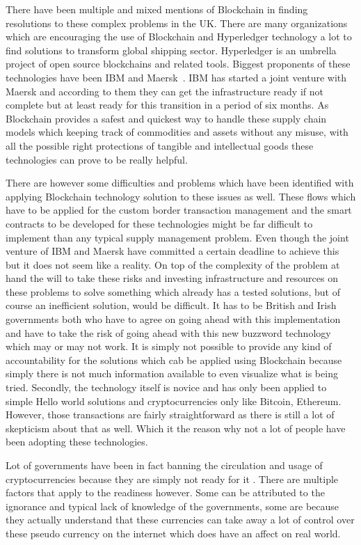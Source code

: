 There have been multiple and mixed mentions of Blockchain in finding
resolutions to these complex problems in the UK. There are many
organizations which are encouraging the use of Blockchain and
Hyperledger technology a lot to find solutions to transform global
shipping sector. Hyperledger is an umbrella project of open source
blockchains and related tools. Biggest proponents of these
technologies have been IBM and Maersk~\cite{stratfor1}. IBM has
started a joint venture with Maersk and according to them they can get
the infrastructure ready if not complete but at least ready for this
transition in a period of six months. As Blockchain provides a safest
and quickest way to handle these supply chain models which keeping
track of commodities and assets without any misuse, with all the
possible right protections of tangible and intellectual goods these
technologies can prove to be really helpful.

There are however some difficulties and problems which have been
identified with applying Blockchain technology solution to these
issues as well. These flows which have to be applied for the custom
border transaction management and the smart contracts to be developed
for these technologies might be far difficult to implement than any
typical supply management problem. Even though the joint venture of
IBM and Maersk have committed a certain deadline to achieve this but
it does not seem like a reality. On top of the complexity of the
problem at hand the will to take these risks and investing
infrastructure and resources on these problems to solve something
which already has a tested solutions, but of course an inefficient
solution, would be difficult. It has to be British and Irish
governments both who have to agree on going ahead with this
implementation and have to take the risk of going ahead with this new
buzzword technology which may or may not work. It is simply not
possible to provide any kind of accountability for the solutions which
cab be applied using Blockchain because simply there is not much
information available to even visualize what is being tried. Secondly,
the technology itself is novice and has only been applied to simple
Hello world solutions and cryptocurrencies only like Bitcoin, Ethereum.
However, those transactions are fairly straightforward as there is
still a lot of skepticism about that as well. Which it the reason why
not a lot of people have been adopting these technologies.

Lot of governments have been in fact banning the circulation and usage
of cryptocurrencies because they are simply not ready for it
\cite{kate2}. There are multiple factors that apply to the readiness
however. Some can be attributed to the ignorance and typical lack of
knowledge of the governments, some are because they actually
understand that these currencies can take away a lot of control over
these pseudo currency on the internet which does have an affect on
real world.

